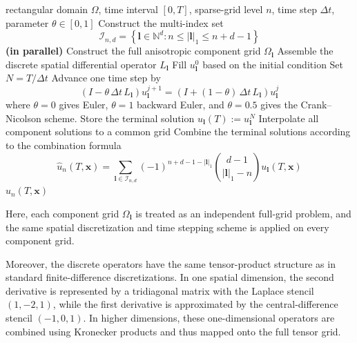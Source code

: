 \begin{algorithm}[H]
\caption{Combination technique}
\begin{algorithmic}[1]
    \Require rectangular domain $\Omega$, time interval $[0,T]$, sparse-grid level $n$, time step $\Delta t$, parameter $\theta \in [0,1]$
    \State Construct the multi-index set
    $$
    \mathcal I_{n,d}
    =
    \left\{
    \mathbf l \in \mathbb N^d : n \le |\mathbf l|_1 \le n+d-1
    \right\}
    $$
     \textbf{(in parallel)}
        \State Construct the full anisotropic component grid $\Omega_\mathbf l$
        \State Assemble the discrete spatial differential operator $L_\mathbf l$
        \State Fill $u_\mathbf l^0$ based on the initial condition
        \State Set $N=T / \Delta t$
            \State Advance one time step by
            $$
            \left(I-\theta \,\Delta t\, L_\mathbf l\right) u_\mathbf l^{j+1}
            =
            \left(I+(1-\theta)\,\Delta t\, L_\mathbf l\right) u_\mathbf l^j
            $$
            \State where $\theta=0$ gives Euler, $\theta=1$ backward Euler, and $\theta=0.5$ gives the Crank--Nicolson scheme.
        \EndFor
        \State Store the terminal solution $u_\mathbf l(T):=u_\mathbf l^N$
    \EndFor
    \State Interpolate all component solutions to a common grid
    \State Combine the terminal solutions according to the combination formula
    $$
    \widehat u_n(T, \mathbf x)
    =
    \sum_{\mathbf l \in \mathcal I_{n,d}}
    (-1)^{n+d-1-|\mathbf l|_1}
    \binom{d-1}{|\mathbf l|_1-n}
    u_\mathbf{l}(T, \mathbf x)
    $$
    \State \Return $\widehat u_n(T,\mathbf x)$
\end{algorithmic}
\end{algorithm}

Here, each component grid $\Omega_{\mathbf l}$ is treated as an
independent full-grid problem,
and the same spatial discretization and time stepping
scheme is applied on every component grid.

Moreover, the discrete operators have the same tensor-product
structure as in standard finite-difference discretizations. In one spatial
dimension, the second derivative is represented by a tridiagonal matrix
with the Laplace stencil $(1,-2,1)$, while the first derivative is approximated by the
central-difference stencil $(-1,0,1)$. In higher dimensions, these one-dimensional operators
are combined using Kronecker products and thus mapped onto the full tensor grid.

